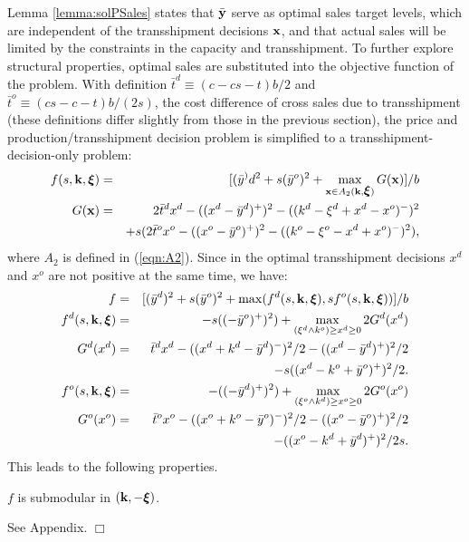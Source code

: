 \documentclass[mnsc,nonblindrev,copyedit]{informs2_wz} %
\newcommand{\proof}{\noindent{\bf Proof: } }
\newcommand{\qed}{ \hfill $\Box$ }
\newcommand{\xiv}{\mbox{\boldmath$\xi$}}
\begin{document}
Lemma \ref{lemma:solPSales} states that $\bar{\bold y}$ serve as optimal sales target levels, which are independent of the transshipment decisions $\bold x$, and that actual sales will be limited by the constraints in the capacity and transshipment.  To further explore structural properties, optimal sales are substituted into the objective function of the problem.  With definition $\bar{t}^d \equiv (c-cs-t)b/2$ and $\bar{t}^o \equiv (cs-c-t)b/(2s)$, the cost difference of cross sales due to transshipment (these definitions differ slightly from those in the previous section), the price and production/transshipment decision problem is simplified to a transshipment-decision-only problem:
\begin{eqnarray}
f(s,\bold{k},\xiv) &=& [(\bar{y}^)d^2 + s(\bar{y}^o)^2 +
\max_{\bold {x} \in
A_2(\bold k, \xiv)} G(\bold x)]/b \label{eqn:fPNewTran}\\
G(\bold x) &=& 2\bar{t}^d x^d - ((x^d - \bar{y}^d)^+)^2 - ((k^d
-\xi^d +x^d-x^o)^-)^2 \label{eqn:GNew} \\ &&+ s(2\bar{t}^ox^o-
((x^o - \bar{y}^o)^+)^2-((k^o-\xi^o -x^d+x^o)^-)^2), \nonumber
\end{eqnarray}
where $A_2$ is defined in (\ref{eqn:A2}).  Since in the optimal transshipment decisions $x^d$ and $x^o$ are not positive at the same time, we have:
\begin{eqnarray}
f &=& [(\bar{y}^d)^2 + s(\bar{y}^o)^2 + \max(f^d(s,\bold k, \xiv),
sf^o(s,\bold k, \xiv))]/b\\
f^d(s,\bold k,\xiv)& =& -s((-\bar{y}^o)^+)^2) +\max_{(\xi^d\wedge
k^o) \geq x^d \geq 0} 2G^d( x^d ) \label{eqn:fd} \\G^d(x^d) &=&
\bar{t}^d x^d - ((x^d+k^d -\bar{y}^d )^-)^2/2 - ((x^d -
\bar{y}^d)^+)^2/2 \nonumber \\&&- s((x^d-k^o+\bar{y}^o)^+)^2/2.
\label{eqn:Gd}
\\f^o(s,\bold k,\xiv)& =& -((-\bar{y}^d)^+)^2) +\max_{(\xi^o\wedge
k^d) \geq x^o \geq 0} 2G^o( x^o ) \label{eqn:fo} \\G^o(x^o) &=&
\bar{t}^o x^o - ((x^o+k^o-\bar{y}^o )^-)^2/2 - ((x^o -
\bar{y}^o)^+)^2/2 \nonumber \\&&- ((x^o-k^d
+\bar{y}^d)^+)^2/2s.\label{eqn:Go}
\end{eqnarray}
This leads to the following properties.


{\lemma $f$ is submodular in $(\bold k, -\xiv)$.
\label{lemma:priceFsub}}

\proof See Appendix. \qed
\end{document}
